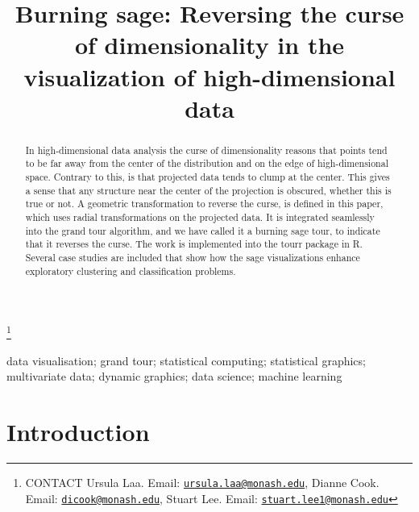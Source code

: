 \documentclass[]{interact}
\theoremstyle{plain}%
\theoremstyle{definition}
\theoremstyle{remark}
\begin{document}

\title{Burning sage: Reversing the curse of dimensionality in the visualization
of high-dimensional data}


\author{
}

\thanks{CONTACT Ursula Laa. Email: \href{mailto:ursula.laa@monash.edu}{\nolinkurl{ursula.laa@monash.edu}}, Dianne Cook. Email: \href{mailto:dicook@monash.edu}{\nolinkurl{dicook@monash.edu}}, Stuart Lee. Email: \href{mailto:stuart.lee1@monash.edu}{\nolinkurl{stuart.lee1@monash.edu}}}

\maketitle

\begin{abstract}
In high-dimensional data analysis the curse of dimensionality reasons
that points tend to be far away from the center of the distribution and
on the edge of high-dimensional space. Contrary to this, is that
projected data tends to clump at the center. This gives a sense that any
structure near the center of the projection is obscured, whether this is
true or not. A geometric transformation to reverse the curse, is defined
in this paper, which uses radial transformations on the projected data.
It is integrated seamlessly into the grand tour algorithm, and we have
called it a burning sage tour, to indicate that it reverses the curse.
The work is implemented into the tourr package in R. Several case
studies are included that show how the sage visualizations enhance
exploratory clustering and classification problems.
\end{abstract}

\begin{keywords}
data visualisation; grand tour; statistical computing; statistical
graphics; multivariate data; dynamic graphics; data science; machine
learning
\end{keywords}

\doublespacing

\hypertarget{introduction}{%
\section{Introduction}\label{introduction}}
\end{document}
